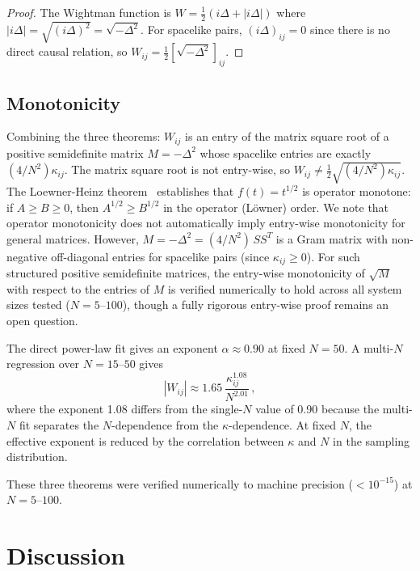 \documentclass[aps,prd,twocolumn,superscriptaddress,nofootinbib]{revtex4-2}
\begin{document}
\begin{proof}
The Wightman function is $W = \tfrac{1}{2}(i\Delta + |i\Delta|)$ where $|i\Delta| = \sqrt{(i\Delta)^2} = \sqrt{-\Delta^2}$. For spacelike pairs, $(i\Delta)_{ij} = 0$ since there is no direct causal relation, so $W_{ij} = \tfrac{1}{2}[\sqrt{-\Delta^2}]_{ij}$.
\end{proof}

\subsection{Monotonicity}

Combining the three theorems: $W_{ij}$ is an entry of the matrix square root of a positive semidefinite matrix $M = -\Delta^2$ whose spacelike entries are exactly $(4/N^2)\kappa_{ij}$. The matrix square root is not entry-wise, so $W_{ij} \neq \tfrac{1}{2}\sqrt{(4/N^2)\kappa_{ij}}$. The Loewner-Heinz theorem~\cite{loewner1934,heinz1951} establishes that $f(t) = t^{1/2}$ is operator monotone: if $A \geq B \geq 0$, then $A^{1/2} \geq B^{1/2}$ in the operator (L\"owner) order. We note that operator monotonicity does not automatically imply entry-wise monotonicity for general matrices. However, $M = -\Delta^2 = (4/N^2)\, S S^T$ is a Gram matrix with non-negative off-diagonal entries for spacelike pairs (since $\kappa_{ij} \geq 0$). For such structured positive semidefinite matrices, the entry-wise monotonicity of $\sqrt{M}$ with respect to the entries of $M$ is verified numerically to hold across all system sizes tested ($N = 5$--$100$), though a fully rigorous entry-wise proof remains an open question.

The direct power-law fit gives an exponent $\alpha \approx 0.90$ at fixed $N = 50$. A multi-$N$ regression over $N = 15$--$50$ gives
\begin{equation}
|W_{ij}| \approx 1.65\,\frac{\kappa_{ij}^{1.08}}{N^{2.01}}\,,
\end{equation}
where the exponent 1.08 differs from the single-$N$ value of 0.90 because the multi-$N$ fit separates the $N$-dependence from the $\kappa$-dependence. At fixed $N$, the effective exponent is reduced by the correlation between $\kappa$ and $N$ in the sampling distribution.

These three theorems were verified numerically to machine precision ($< 10^{-15}$) at $N = 5$--$100$.

\section{Discussion}
\end{document}
